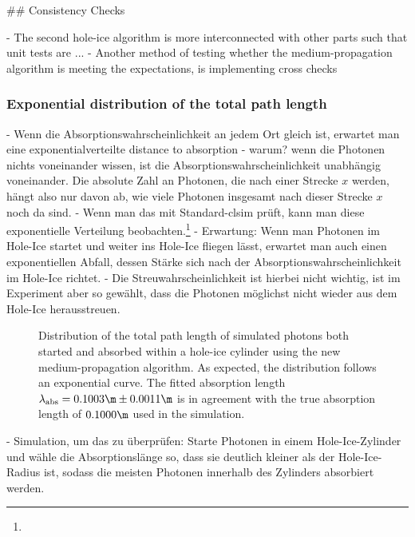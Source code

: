 
## Consistency Checks


- The second hole-ice algorithm is more interconnected with other parts such that unit tests are ...
- Another method of testing whether the medium-propagation algorithm is meeting the expectations, is implementing cross checks

\subsubsection{Exponential distribution of the total path length}


- Wenn die Absorptionswahrscheinlichkeit an jedem Ort gleich ist, erwartet man eine exponentialverteilte distance to absorption
- warum? wenn die Photonen nichts voneinander wissen, ist die Absorptionswahrscheinlichkeit unabhängig voneinander. Die absolute Zahl an Photonen, die nach einer Strecke $x$ werden, hängt also nur davon ab, wie viele Photonen insgesamt nach dieser Strecke $x$ noch da sind.
- Wenn man das mit Standard-clsim prüft, kann man diese exponentielle Verteilung beobachten.\footnote{}
- Erwartung: Wenn man Photonen im Hole-Ice startet und weiter ins Hole-Ice fliegen lässt, erwartet man auch einen exponentiellen Abfall, dessen Stärke sich nach der Absorptionswahrscheinlichkeit im Hole-Ice richtet.
- Die Streuwahrscheinlichkeit ist hierbei nicht wichtig, ist im Experiment aber so gewählt, dass die Photonen möglichst nicht wieder aus dem Hole-Ice herausstreuen.

\begin{figure}
  \caption{Distribution of the total path length of simulated photons both started and absorbed within a hole-ice cylinder using the new medium-propagation algorithm. As expected, the distribution follows an exponential curve. The fitted absorption length $\lambda_\text{abs}=0.1003\m \pm 0.0011\m$ is in agreement with the true absorption length of $0.1000\m$ used in the simulation.}
\end{figure}

- Simulation, um das zu überprüfen: Starte Photonen in einem Hole-Ice-Zylinder und wähle die Absorptionslänge so, dass sie deutlich kleiner als der Hole-Ice-Radius ist, sodass die meisten Photonen innerhalb des Zylinders absorbiert werden.

